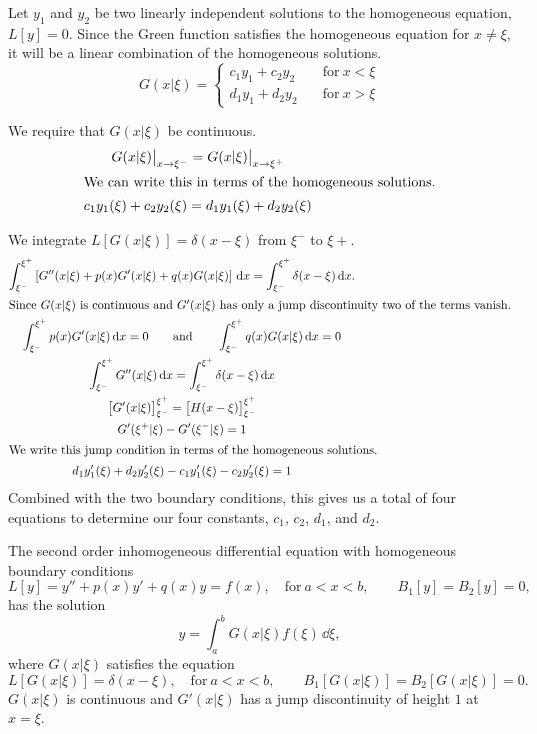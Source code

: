 Let $y_1$ and $y_2$ be two linearly independent solutions to the homogeneous
equation, $L[y] = 0$.  Since the Green function satisfies the 
homogeneous equation for $x \neq \xi$, it will be a linear combination of
the homogeneous solutions.
\[
G(x|\xi) = 
\begin{cases}
  c_1 y_1 + c_2 y_2 \quad &\mathrm{for}\ x < \xi \\
  d_1 y_1 + d_2 y_2 \quad &\mathrm{for}\ x > \xi
\end{cases}
\]

We require that $G(x|\xi)$ be continuous.
\begin{gather*}
  G(x|\xi)\big|_{x \to \xi^-} = G(x|\xi)\big|_{x \to \xi^+} 
  \\
  \intertext{We can write this in terms of the homogeneous solutions.}
  c_1 y_1(\xi) + c_2 y_2(\xi) = d_1 y_1(\xi) + d_2 y_2(\xi)
\end{gather*}

We integrate $L[G(x|\xi)] = \delta(x-\xi)$ from $\xi^-$ to $\xi+$.
\begin{gather*}
  \int_{\xi^-}^{\xi^+} \left[G''(x|\xi) + p(x)G'(x|\xi)+q(x)G(x|\xi) \right]\,\mathrm{d} x = 
  \int_{\xi^-}^{\xi^+} \delta(x-\xi)\,\mathrm{d} x. 
  \\
  \intertext{Since $G(x|\xi)$ is continuous and $G'(x|\xi)$ has only a 
    jump discontinuity two of the terms vanish.}
  \int_{\xi^-}^{\xi^+} p(x) G'(x|\xi)\,\mathrm{d} x = 0 \qquad \mathrm{and} \qquad
  \int_{\xi^-}^{\xi^+} q(x) G(x|\xi)\,\mathrm{d} x = 0
  \\
  \int_{\xi^-}^{\xi^+} G''(x|\xi)\,\mathrm{d} x = \int_{\xi^-}^{\xi^+} \delta(x-\xi)\,\mathrm{d} x 
  \\
  \big[ G'(x|\xi) \big]_{\xi^-}^{\xi^+}
  = \big[ H(x-\xi) \big]_{\xi^-}^{\xi^+} 
  \\
  G'(\xi^+|\xi) - G'(\xi^-|\xi) = 1
  \\
  \intertext{We write this jump condition in terms of the homogeneous 
    solutions.}
  d_1 y_1'(\xi) + d_2 y_2'(\xi) - c_1 y_1'(\xi) - c_2 y_2'(\xi) = 1
\end{gather*}
Combined with the two boundary conditions, this gives us a total of 
four equations to determine our four constants, $c_1$, $c_2$, $d_1$, and $d_2$.




\begin{Result}
  The second order inhomogeneous differential equation with homogeneous 
  boundary conditions
  \[ 
  L[y] = y'' + p(x)y' + q(x) y = f(x), \quad \mathrm{for}\ a < x < b, 
  \qquad B_1[y] = B_2[y] = 0,
  \]
  has the solution
  \[ 
  y = \int_a^b G(x|\xi)f(\xi)\,\dd \xi,
  \]
  where $G(x|\xi)$ satisfies the equation
  \[ 
  L[G(x|\xi)] = \delta(x-\xi), \quad \mathrm{for}\ a<x<b, \qquad
  B_1[G(x|\xi)] = B_2[G(x|\xi)] = 0.
  \]
  $G(x|\xi)$ is continuous and $G'(x|\xi)$ has a jump discontinuity of
  height $1$ at $x = \xi$.
\end{Result}






